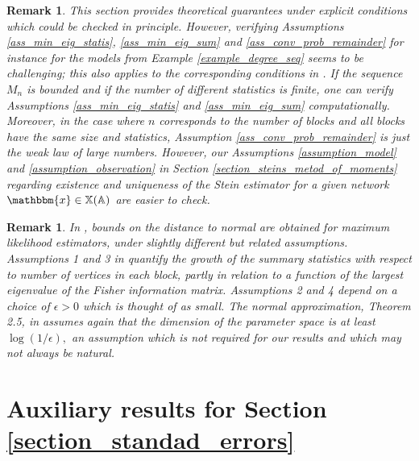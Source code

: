\documentclass{article}
\newtheorem{Remark}[Theorem]{Remark}
\begin{document}
\begin{Remark}
    This section provides theoretical guarantees under explicit conditions which could be checked in principle.   
    However, verifying Assumptions \ref{ass_min_eig_statis}, \ref{ass_min_eig_sum} and \ref{ass_conv_prob_remainder} for instance for the models from Example  \ref{example_degree_seq} seems to be challenging; this also applies to the corresponding conditions in \cite{stewart2026rates}. If the sequence $M_n$ is bounded and if the number of different statistics is finite, one can verify Assumptions \ref{ass_min_eig_statis} and \ref{ass_min_eig_sum} computationally. Moreover, in the case where $n$ corresponds to the number of blocks and all blocks have the same size and statistics, Assumption \ref{ass_conv_prob_remainder} is just the weak law of large numbers. However, our Assumptions \ref{assumption_model} and \ref{assumption_observation} in Section \ref{section_steins_metod_of_moments} regarding existence and uniqueness of the Stein estimator for a given network $\mathbbm{x} \in \mathbb{X}(\mathbb{A})$ are easier to check.
\end{Remark}

\begin{Remark}
    In \cite{stewart2026rates}, bounds on the distance to normal are obtained for maximum likelihood estimators, under slightly different but related assumptions. Assumptions 1 and 3 in \cite{stewart2026rates} quantify the growth of the summary statistics with respect to number of vertices in each block, partly in relation to a function of the largest eigenvalue of the Fisher information matrix. Assumptions 2 and 4 
    depend on a choice of $\epsilon >0$ which is thought of as small. The normal approximation, Theorem 2.5, in \cite{stewart2026rates} assumes again that the dimension of the parameter space is at least $\log (1/ \epsilon),$ an assumption which is not required for our results and which may not always be natural. 
\end{Remark}



\clearpage
\appendix




\section{Auxiliary results for Section \ref{section_standad_errors}}
\end{document}
